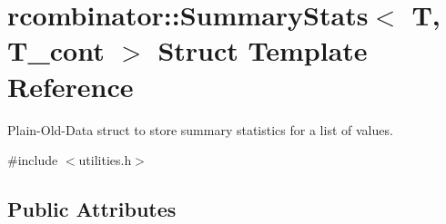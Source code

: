\hypertarget{structrcombinator_1_1SummaryStats}{}\section{rcombinator\+:\+:Summary\+Stats$<$ T, T\+\_\+cont $>$ Struct Template Reference}
\label{structrcombinator_1_1SummaryStats}


Plain-\/\+Old-\/\+Data struct to store summary statistics for a list of values.  




{\ttfamily \#include $<$utilities.\+h$>$}

\subsection*{Public Attributes}
